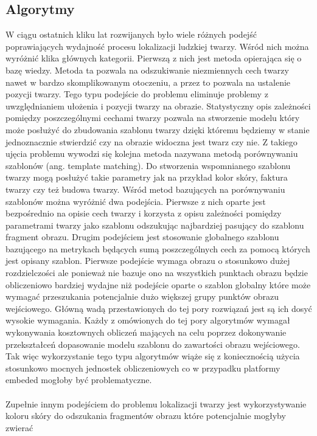 \subsection{Algorytmy}
W ciągu ostatnich kliku lat rozwijanych było wiele różnych podejść poprawiających
wydajność procesu lokalizacji ludzkiej twarzy. Wśród nich można wyróżnić klika
głównych kategorii. Pierwszą z nich jest metoda opierająca się o bazę wiedzy.
Metoda ta pozwala na odszukiwanie niezmiennych cech twarzy nawet w bardzo
skomplikowanym otoczeniu, a przez to pozwala na ustalenie pozycji twarzy. Tego
typu podejście do problemu eliminuje problemy z uwzględnianiem ułożenia i pozycji
twarzy na obrazie. Statystyczny opis zależności pomiędzy poszczególnymi cechami
twarzy pozwala na stworzenie modelu który może posłużyć do zbudowania szablonu
twarzy dzięki któremu będziemy w stanie jednoznacznie stwierdzić czy na obrazie
widoczna jest twarz czy nie. Z takiego ujęcia problemu wywodzi się kolejna metoda
nazywana metodą porównywaniu szablonów (ang. template matching). Do stworzenia
wspomnianego szablonu twarzy mogą posłużyć takie parametry jak na przykład kolor
skóry, faktura twarzy czy też budowa twarzy. Wśród metod bazujących na
porównywaniu szablonów można wyróżnić dwa podejścia. Pierwsze z nich oparte jest
bezpośrednio na opisie cech twarzy i korzysta z opisu zależności pomiędzy
parametrami twarzy jako szablonu odszukując najbardziej pasujący do szablonu
fragment obrazu. Drugim podejściem jest stosowanie globalnego szablonu bazującego
na metrykach będących sumą poszczególnych cech za pomocą których jest opisany
szablon. Pierwsze podejście wymaga obrazu o stosunkowo dużej rozdzielczości ale
ponieważ nie bazuje ono na wszystkich punktach obrazu będzie obliczeniowo
bardziej wydajne niż podejście oparte o szablon globalny które może wymagać
przeszukania potencjalnie dużo większej grupy punktów obrazu wejściowego. Główną
wadą przestawionych do tej pory rozwiązań jest są ich dosyć wysokie wymagania.
Każdy z omówionych do tej pory algorytmów wymagał wykonywania kosztownych
obliczeń mających na celu poprzez dokonywanie przekształceń dopasowanie modelu
szablonu do zawartości obrazu wejściowego. Tak więc wykorzystanie tego typu
algorytmów wiąże się z koniecznością użycia stosunkowo mocnych jednostek
obliczeniowych co w przypadku platformy embeded mogłoby być problematyczne.\\
\\
Zupełnie innym podejściem do problemu lokalizacji twarzy jest wykorzystywanie
koloru skóry do odszukania fragmentów obrazu które potencjalnie mogłyby zwierać
